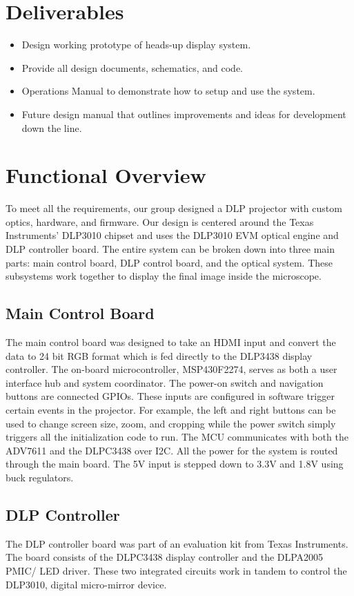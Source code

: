\documentclass[12pt,a4paper]{article}
\begin{document}
\section{Deliverables}
\begin{itemize}
	\item Design working prototype of heads-up display system.
	\item Provide all design documents, schematics, and code.
	\item Operations Manual to demonstrate how to setup and use the system.
	\item Future design manual that outlines improvements and ideas for development down the line.
\end{itemize}


\section{Functional Overview}
To meet all the requirements, our group designed a DLP projector with custom optics, hardware, and firmware. Our design is centered around the Texas Instruments’ DLP3010 chipset and uses the DLP3010 EVM optical engine and DLP controller board.  The entire system can be broken down into three main parts: main control board, DLP control board, and the optical system. These subsystems work together to display the final image inside the microscope. 



\subsection{Main Control Board}
The main control board was designed to take an HDMI input and convert the data to 24 bit RGB format which is fed directly to the DLP3438 display controller. The on-board microcontroller, MSP430F2274, serves as both a user interface hub and system coordinator. The power-on switch and navigation buttons are connected GPIOs. These inputs are configured in software trigger certain events in the projector. For example, the left and right buttons can be used to change screen size, zoom, and cropping while the power switch simply triggers all the initialization code to run. The MCU communicates with both the ADV7611 and the DLPC3438 over I2C. All the power for the system is routed through the main board. The 5V input is stepped down to 3.3V and 1.8V using buck regulators. 

\subsection{DLP Controller}
The DLP controller board was part of an evaluation kit from Texas Instruments. The board consists of the DLPC3438 display controller and the DLPA2005 PMIC/ LED driver. These two integrated circuits work in tandem to control the DLP3010, digital micro-mirror device.
\end{document}
